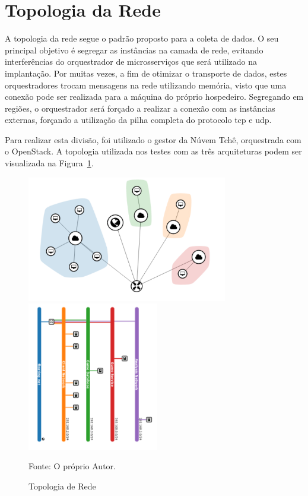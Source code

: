 \section{Topologia da Rede}
\label{sec:topologia}

A topologia da rede segue o padrão proposto para a coleta de dados.
%
O seu principal objetivo é segregar as instâncias na camada de rede, evitando interferências do orquestrador de microsserviços que será utilizado na implantação.
%
Por muitas vezes, a fim de otimizar o transporte de dados, estes orquestradores trocam mensagens na rede utilizando memória, visto que uma conexão pode ser realizada para a máquina do próprio hospedeiro.
%
Segregando em regiões, o orquestrador será forçado a realizar a conexão com as instâncias externas, forçando a utilização da pilha completa do protocolo \ac{tcp} e \ac{udp}.

Para realizar esta divisão, foi utilizado o gestor da Núvem Tchê, orquestrada com o OpenStack.
%
A topologia utilizada nos testes com as três arquiteturas podem ser visualizada na Figura~\ref{fig:topologia}.

\begin{figure}[htb!]
    \caption{Topologia de Rede}
    \label{fig:topologia}
    \begin{minipage}{.45\textwidth}
        \includegraphics[height=5.5cm]{img/cap5/topology_graph.png}
      \centering
    \end{minipage}
    \begin{minipage}{.45\textwidth}
        \includegraphics[height=6.5cm]{img/cap5/topology.png}
        \centering        
    \end{minipage}


    Fonte: O próprio Autor.
\end{figure}

